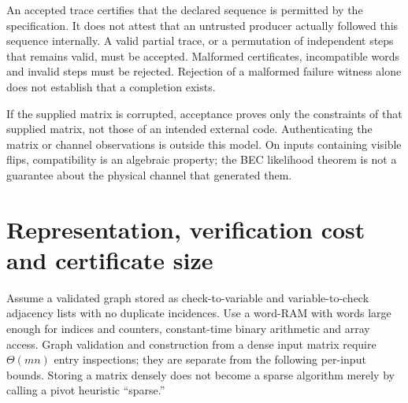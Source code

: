 An accepted trace certifies that the declared sequence is permitted
by the specification. It does not attest that an untrusted producer
actually followed this sequence internally. A valid partial trace,
or a permutation of independent steps that remains valid, must be
accepted. Malformed certificates, incompatible words and invalid
steps must be rejected. Rejection of a malformed failure witness
alone does not establish that a completion exists.

If the supplied matrix is corrupted, acceptance proves only the
constraints of that supplied matrix, not those of an intended
external code. Authenticating the matrix or channel observations
is outside this model. On inputs containing visible flips,
compatibility is an algebraic property; the BEC likelihood theorem
is not a guarantee about the physical channel that generated them.

\section{Representation, verification cost and certificate size}\label{sec:cost}
Assume a validated graph stored as check-to-variable and
variable-to-check adjacency lists with no duplicate incidences.
Use a word-RAM with words large enough for indices and counters,
constant-time binary arithmetic and array access. Graph validation
and construction from a dense input matrix require $\Theta(mn)$
entry inspections; they are separate from the following per-input
bounds. Storing a matrix densely does not become a sparse algorithm
merely by calling a pivot heuristic ``sparse.''

